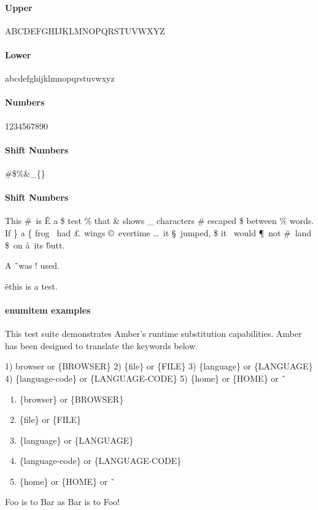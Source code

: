 \documentclass[12pt]{article}%
\begin{document}
%

\paragraph{Upper}
ABCDEFGHIJKLMNOPQRSTUVWXYZ

\paragraph{Lower}
abcdefghijklmnopqrstuvwxyz

\paragraph{Numbers}
1234567890

\paragraph{Shift Numbers}
\#\$\%\&\_\{\}

\paragraph{Shift Numbers}
This \#\ is \v{E} a \$ test \% that \& shows \_ characters \# escaped \$ between \%
words.  If \} a \{ frog \ddag\ had \pounds\ wings \copyright\ evertime \dots\
it \S\ jumped, \$ it \dag\ would \P\ not \#\ land \$\ on \aa\ its \^ butt.

A \~\ was ! used.

\"{e}this is a test.

\paragraph{enumitem examples}
\begin{description}[align=right,leftmargin=3.2cm,labelindent=3.0cm]
  \item[Purpose:]
    This test suite demonstrates Amber's runtime substitution capabilities.
    Amber has been designed to translate the keywords below.

    1) {browser} or \{BROWSER\}
    2) \{file\} or \{FILE\}  
    3) \{language\} or \{LANGUAGE\}  
    4) \{language-code\} or \{LANGUAGE-CODE\}  
    5) \{home\} or \{HOME\} or \~\

    \begin{enumerate}
      \item \{browser\} or \{BROWSER\}
      \item \{file\} or \{FILE\}  
      \item \{language\} or \{LANGUAGE\}  
      \item \{language-code\} or \{LANGUAGE-CODE\}  
      \item \{home\} or \{HOME\} or \~\
    \end{enumerate}

  \item[Foo:] Foo is to Bar as Bar is to Foo!

\end{description} 
\end{document}
